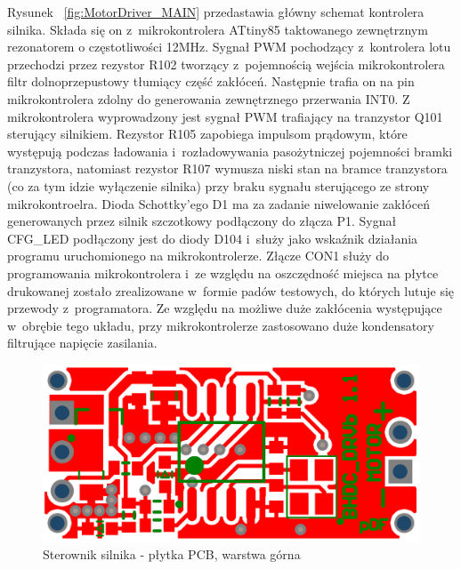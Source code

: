 Rysunek ~\ref{fig:MotorDriver_MAIN} przedastawia główny schemat kontrolera silnika. Składa się on z~mikrokontrolera ATtiny85 taktowanego zewnętrznym rezonatorem o częstotliwości 12MHz. Sygnał PWM pochodzący z~kontrolera lotu przechodzi przez rezystor R102 tworzący z~pojemnością wejścia mikrokontrolera filtr dolnoprzepustowy tłumiący część zakłóceń. Następnie trafia on na pin mikrokontrolera zdolny do generowania zewnętrznego przerwania INT0. Z mikrokontrolera wyprowadzony jest sygnał PWM  trafiający na tranzystor Q101 sterujący silnikiem. Rezystor R105 zapobiega impulsom prądowym, które występują podczas ładowania i~rozładowywania pasożytniczej pojemności bramki tranzystora, natomiast rezystor R107 wymusza niski stan na bramce tranzystora (co za tym idzie wyłączenie silnika) przy braku sygnału sterującego ze strony mikrokontroelra. Dioda Schottky'ego D1 ma za zadanie niwelowanie zakłóceń generowanych przez silnik szczotkowy podłączony do złącza P1. Sygnał CFG\_LED podłączony jest do diody D104 i~służy jako wskaźnik działania programu uruchomionego na mikrokontrolerze. Złącze CON1 służy do programowania mikrokontrolera i~ze względu na oszczędność miejsca na płytce drukowanej zostało zrealizowane w~formie padów testowych, do których lutuje się przewody z~programatora. Ze względu na możliwe duże zakłócenia występujące w~obrębie tego układu, przy mikrokontrolerze zastosowano duże kondensatory filtrujące napięcie zasilania.

\begin{figure}[H]
	\centering
	\includegraphics[scale=0.4]{Pictures/MotorDriverPCB_Top.png}
		\caption[Sterownik silnika - płytka PCB, warstrwa górna]{Sterownik silnika - płytka PCB, warstwa górna}
	\label{fig:MotorDriverPCB_Top}
\end{figure}


